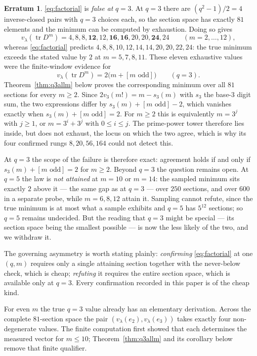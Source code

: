 \documentclass[11pt]{article}
\theoremstyle{plain}
\theoremstyle{definition}
\newtheorem{erratum}[theorem]{Erratum}
\newcommand{\tr}{\operatorname{tr}}
\newcommand{\vlam}{v_\lambda}
\begin{document}
\begin{erratum}\label{err:factorial}
\eqref{eq:factorial} is \emph{false at $q=3$}. At $q=3$ there are
$(q^2-1)/2=4$ inverse-closed pairs with $q=3$ choices each, so the section
space has exactly $81$ elements and the minimum can be computed by exhaustion.
Doing so gives
\[
\vlam(\tr D^m)=4,8,8,\mathbf{12},12,\mathbf{16},\mathbf{16},20,20,\mathbf{24},24
\qquad (m=2,\dots,12),
\]
whereas \eqref{eq:factorial} predicts $4,8,8,10,12,14,14,20,20,22,24$: the true
minimum exceeds the stated value by $2$ at $m=5,7,8,11$. These eleven
exhaustive values were the finite-window evidence for
\[
\vlam(\tr D^m)=2\bigl(m+[m\text{ odd}]\bigr)\qquad (q=3).
\]
Theorem~\ref{thm:q3allm} below proves the corresponding minimum over all $81$
sections for every $m\ge2$.
Since $2v_3(m!)=m-s_3(m)$ with $s_3$ the base-$3$ digit sum, the two
expressions differ by $s_3(m)+[m\text{ odd}]-2$, which vanishes exactly when
$s_3(m)+[m\text{ odd}]=2$. For $m\ge2$ this is equivalently
$m=3^j$ with $j\ge1$, or $m=3^i+3^j$ with $0\le i\le j$. The prime-power
tower therefore lies inside, but does not exhaust, the locus on which the two
agree, which is why its four confirmed rungs $8,20,56,164$ could not detect
this.

At $q=3$ the scope of the failure is therefore exact: agreement holds if and
only if $s_3(m)+[m\text{ odd}]=2$ for $m\ge2$. Beyond $q=3$ the question
remains open. At $q=5$ the law is \emph{not attained} at $m=10$ or $m=14$:
the sampled minimum sits exactly
$2$ above it --- the same gap as at $q=3$ --- over $250$ sections, and over
$600$ in a separate probe, while $m=6,8,12$ attain it. Sampling cannot refute,
since the true minimum is at most what a sample exhibits and $q=5$ has $5^{12}$
sections; so $q=5$ remains undecided. But the reading that $q=3$ might be
special --- its section space being the smallest possible --- is now the less
likely of the two, and we withdraw it.

The governing asymmetry is worth stating plainly: \emph{confirming}
\eqref{eq:factorial} at one $(q,m)$ requires only a single attaining section
together with the never-below check, which is cheap; \emph{refuting} it
requires the entire section space, which is available only at $q=3$. Every
confirmation recorded in this paper is of the cheap kind.

For even $m$ the true $q=3$ value already has an elementary derivation. Across
the complete $81$-section space the pair
$(\vlam(e_2),\vlam(e_3))$ takes exactly four non-degenerate values. The
finite computation first showed that each determines the measured vector for
$m\le10$; Theorem~\ref{thm:q3allm} and its corollary below remove that finite
qualifier.


\end{erratum}
\end{document}
